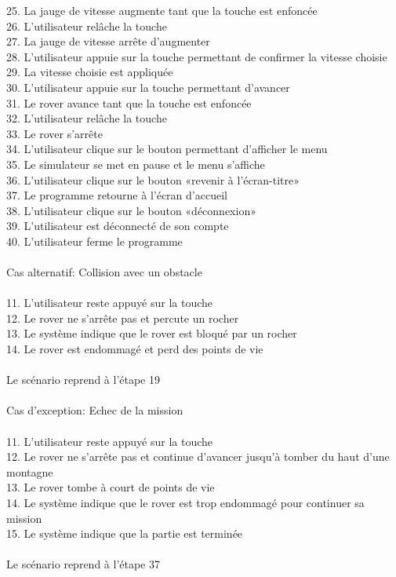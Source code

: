 \documentclass[12pt,a4paper]{scrartcl}
\begin{document}
	25. La jauge de vitesse augmente tant que la touche est enfoncée\\
	26. L’utilisateur relâche la touche\\
	27. La jauge de vitesse arrête d’augmenter\\
	28. L’utilisateur appuie sur la touche permettant de confirmer la vitesse choisie\\
	29. La vitesse choisie est appliquée\\
	30. L’utilisateur appuie sur la touche permettant d’avancer\\
	31. Le rover avance tant que la touche est enfoncée\\
	32. L’utilisateur relâche la touche\\
	33. Le rover s’arrête\\
	34. L’utilisateur clique sur le bouton permettant d’afficher le menu\\
	35. Le simulateur se met en pause et le menu s’affiche \\
	36. L’utilisateur clique sur le bouton «revenir à l’écran-titre»\\
	37. Le programme retourne à l’écran d’accueil\\
	38. L’utilisateur clique sur le bouton «déconnexion»\\
	39. L’utilisateur est déconnecté de son compte\\
	40. L’utilisateur ferme le programme\\
\\
Cas alternatif: Collision avec un obstacle\\
\\
	11. L’utilisateur reste appuyé sur la touche\\
	12. Le rover ne s’arrête pas et percute un rocher\\
	13. Le système indique que le rover est bloqué par un rocher\\
	14. Le rover est endommagé et perd des points de vie\\
\\
	Le scénario reprend à l’étape 19\\
\\
Cas d’exception: Echec de la mission\\
\\
	11. L’utilisateur reste appuyé sur la touche\\
	12. Le rover ne s’arrête pas et continue d’avancer jusqu’à tomber du haut d’une montagne\\
	13. Le rover tombe à court de points de vie\\
	14. Le système indique que le rover est trop endommagé pour continuer sa mission\\
	15. Le système indique que la partie est terminée\\
\\
	Le scénario reprend à l’étape 37\\
\end{document}
